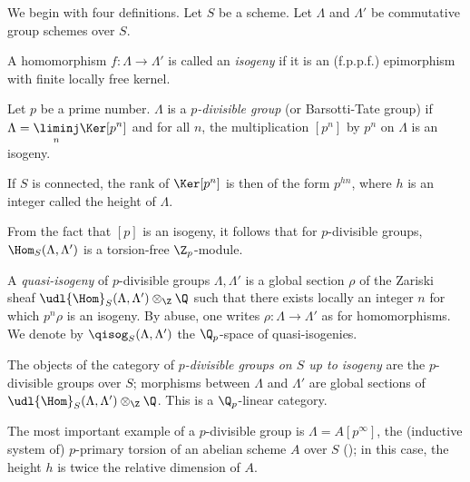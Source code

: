 \begin{para}\label{para:2.1.1} We begin with four definitions. Let $S$ be a scheme. Let
$\Lambda$ and $\Lambda'$ be commutative group schemes over $S$.  

A
homomorphism $f:\Lambda \rightarrow \Lambda'$ is called an {\it isogeny}
if it is an (f.p.p.f.) epimorphism with finite locally free kernel.


Let $p$ be a prime number. $\Lambda$ is a {\it $p$-divisible group}
(or Barsotti-Tate group) if $\displaystyle
\Lambda=\underset{n}{\liminj}\Ker [p^n]$ and for all $n$, the multiplication
$[p^n]$ by $p^n$ on $\Lambda$ is an isogeny.

\par\noindent If $S$ is connected, the rank of $\Ker [p^n]$ is then of
the form $p^{hn}$, where $h$ is an integer called the height of $\Lambda$.  

From the fact that $[p]$ is an isogeny, it follows that for 
$p$-divisible groups, $\Hom_S(\Lambda,\Lambda')$ is a torsion-free 
${\Z}_p$-module. 

A {\it quasi-isogeny} of $p$-divisible groups $\Lambda, \Lambda'$ is a
global section $\rho$ of the Zariski sheaf $ \udl{\Hom}_S(\Lambda,
\Lambda')\otimes_{\Z}{\Q}$ such that there exists locally an integer $n$
for which $p^n\rho$ is an isogeny. By abuse, one writes $\rho: \Lambda
\rightarrow \Lambda'$ as for homomorphisms. We denote by
$\qisog_S(\Lambda, \Lambda')$ the ${\Q}_p$-space of
quasi-isogenies.


The objects of the category of {\it $p$-divisible groups on $S$ up
to isogeny} are the $p$-divisible groups over $S$; morphisms between
$\Lambda $ and $\Lambda'$ are global sections of $ \udl{\Hom}_S(\Lambda,
\Lambda')\otimes_{\Z}{\Q}$. This is a $\Q_p$-linear category.
\end{para}

\begin{para}\label{para:2.1.2} The most important example of a
 $p$-divisible group is $\Lambda =A[p^\infty]$, the (inductive system
 of) $p$-primary torsion of an abelian scheme $A$ over $S$
 (\cite{pg}); in this case, the height 
$h$ is twice the relative dimension of $A$. 
\end{para}

